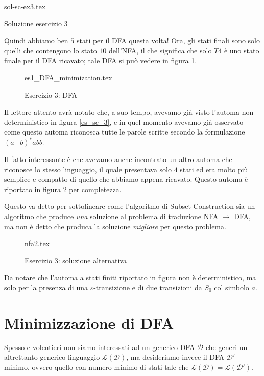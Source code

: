 \documentclass[class=book, crop=false, oneside, 12pt]{standalone}
\begin{document}
\begin{table}[H]
	\centering
	{sol-sc-ex3.tex}
    \caption{Soluzione esercizio 3}
    \label{sol-sc-ex3}
\end{table}

Quindi abbiamo ben \(5\) stati per il DFA questa volta! Ora, gli stati finali sono solo quelli che contengono lo stato \(10\) dell'NFA, il che significa che solo \(T4\) è uno stato finale per il DFA ricavato; tale DFA si può vedere in figura \ref{sol_sc_3}.
\begin{figure}[H]
    \centering
    {es1_DFA_minimization.tex}
    \caption{Esercizio 3: DFA}
    \label{sol_sc_3}
\end{figure}

Il lettore attento avrà notato che, a suo tempo, avevamo già visto l'automa non deterministico in figura \ref{es_sc_3}, e in quel momento avevamo già osservato come questo automa riconosca tutte le parole scritte secondo la formulazione \((a \mid b)^* abb\).

Il fatto interessante è che avevamo anche incontrato un altro automa che riconosce lo stesso linguaggio, il quale presentava solo \(4\) stati ed era molto più semplice e compatto di quello che abbiamo appena ricavato. Questo automa è riportato in figura \ref{sol_sc_3_v2} per completezza.

Questo va detto per sottolineare come l'algoritmo di Subset Construction sia un algoritmo che produce \emph{una} soluzione al problema di traduzione NFA \(\to\) DFA, ma non è detto che produca la soluzione \emph{migliore} per questo problema.

\begin{figure}[H]
    \centering
    {nfa2.tex}
    \caption{Esercizio 3: soluzione alternativa}
    \label{sol_sc_3_v2}
\end{figure}

Da notare che l'automa a stati finiti riportato in figura non è deterministico, ma solo per la presenza di una \(\varepsilon\)-transizione e di due transizioni da \(S_{0}\) col simbolo \(a\).

\section{Minimizzazione di DFA}
Spesso e volentieri non siamo interessati ad un generico DFA \(\mathcal{D}\) che generi un altrettanto generico linguaggio \(\mathcal{L(D)}\), ma desideriamo invece il DFA \(\mathcal{D}'\) minimo, ovvero quello con numero minimo di stati tale che \(\mathcal{L(D)} = \mathcal{L(D')}\). 
\end{document}
